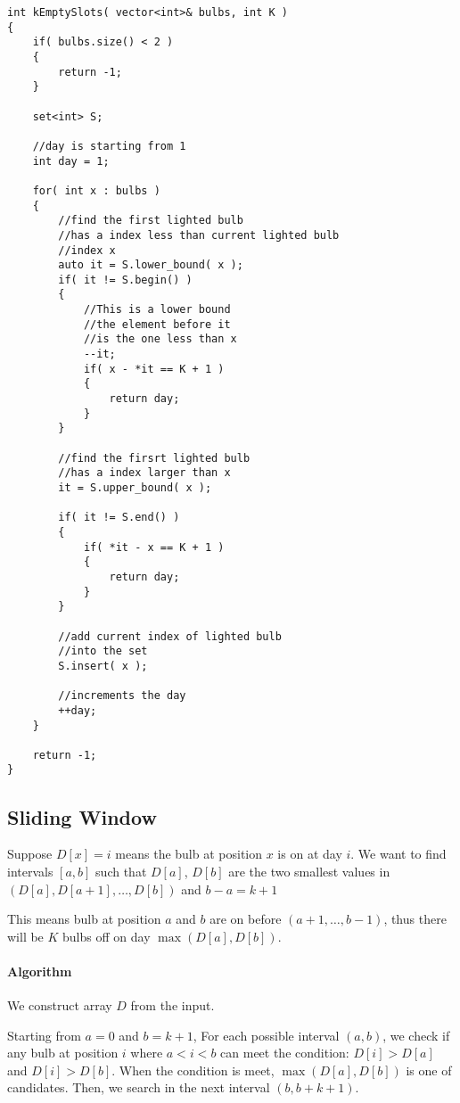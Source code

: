 \setcounter{lstlisting}{0}
\begin{lstlisting}[style=customc, caption={Tree Set}]
int kEmptySlots( vector<int>& bulbs, int K )
{
    if( bulbs.size() < 2 )
    {
        return -1;
    }

    set<int> S;

    //day is starting from 1
    int day = 1;

    for( int x : bulbs )
    {
        //find the first lighted bulb
        //has a index less than current lighted bulb
        //index x
        auto it = S.lower_bound( x );
        if( it != S.begin() )
        {
            //This is a lower bound
            //the element before it
            //is the one less than x
            --it;
            if( x - *it == K + 1 )
            {
                return day;
            }
        }

        //find the firsrt lighted bulb
        //has a index larger than x
        it = S.upper_bound( x );

        if( it != S.end() )
        {
            if( *it - x == K + 1 )
            {
                return day;
            }
        }

        //add current index of lighted bulb
        //into the set
        S.insert( x );

        //increments the day
        ++day;
    }

    return -1;
}
\end{lstlisting}

\subsection{Sliding Window}
Suppose $D[x]=i$ means the bulb at position $x$ is on at day $i$. We want to find intervals $[a,b]$ such that $D[a]$, $D[b]$ are the two smallest values in $(D[a], D[a+1], \ldots, D[b])$ and $b-a=k+1$

This means bulb at position $a$ and $b$ are on before $(a+1, \ldots, b-1)$, thus there will be $K$ bulbs off on day $\max(D[a], D[b])$.

\paragraph{Algorithm}

We construct array $D$ from the input. 

Starting from $a=0$ and $b=k+1$, For each possible interval $(a,b)$, we check if any bulb at position $i$ where $a<i<b$ can meet the condition: $D[i] > D[a] $ and $D[i] > D[b]$. When the condition is meet, $\max(D[a], D[b])$ is one of candidates. Then, we search in the next interval $(b, b+k+1)$.

